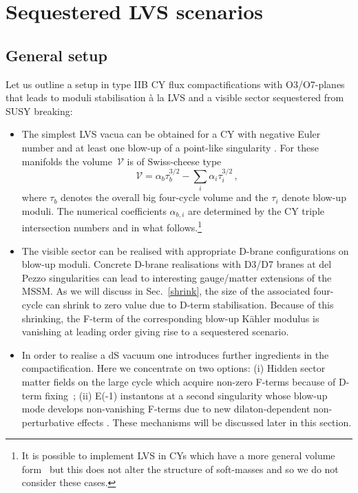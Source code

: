 \documentclass[11pt,a4paper]{article}
\newcommand{\be}{\begin{equation}}
\newcommand{\ee}{\end{equation}}
\newcommand\vo{{\mathcal{V}}}
\begin{document}
\section{Sequestered LVS scenarios}
\label{slvs}

\subsection{General setup}
\label{generalsetup}

Let us outline a setup in type IIB CY flux compactifications with O3/O7-planes that leads to moduli stabilisation
\`a la LVS and a visible sector sequestered from SUSY breaking:

\begin{itemize}
\item The simplest LVS vacua can be obtained for a CY with negative Euler number and at least one blow-up
of a point-like singularity \cite{Cicoli:2008va}. For these manifolds the volume~$\vo$ is of Swiss-cheese type
\be
\vo = \alpha_b \tau_b^{3/2} - \sum_i \alpha_i \tau_i^{3/2}\,,
\label{eq:vol}
\ee
where $\tau_b$ denotes the overall big four-cycle volume and the $\tau_i$ denote blow-up moduli. The numerical coefficients $\alpha_{b,i}$ are determined by the CY triple intersection numbers and in what follows.\footnote{It is possible to implement LVS in CYs which have a more general volume form~\cite{Cicoli:2008va} but this does not alter the structure of soft-masses and so we do not consider these cases.}

\item The visible sector can be realised with appropriate D-brane configurations on blow-up moduli. Concrete D-brane realisations with D3/D7 branes at del Pezzo singularities can lead to interesting gauge/matter extensions of the MSSM. As we will discuss in Sec.~\ref{shrink}, the size of the associated four-cycle can shrink to zero value due to D-term stabilisation. Because of this shrinking, the F-term of the corresponding blow-up K\"ahler modulus is vanishing at leading order giving rise to a sequestered scenario.

\item In order to realise a dS vacuum one introduces further ingredients in the compactification. Here we concentrate on two options:
(i) Hidden sector matter fields on the large cycle which acquire non-zero F-terms because of D-term fixing~\cite{Cicoli:2012vw}; (ii) E(-1) instantons at a second singularity whose blow-up mode develops non-vanishing F-terms due to new dilaton-dependent non-perturbative effects \cite{Cicoli:2012fh}. These mechanisms will be discussed later in this section.
\end{itemize}
\end{document}
